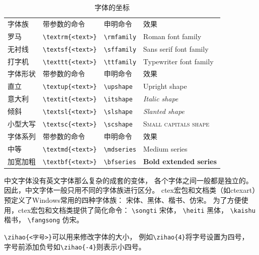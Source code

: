 \documentclass[UTF8]{ctexart}
\numberwithin{equation}{section}			%
\begin{document}
    \begin{table}[hbp]
        \centering
        \caption{字体的坐标}
        \label{tab:fontcoord}
        \begin{tabular}{llll}
            \toprule
            字体族 & 带参数的命令 & 申明命令 & 效果 \\
            罗马 & \verb|\textrm{<text>}| & \verb|\rmfamily|
                & \rmfamily Roman font family \\
            无衬线 & \verb|\textsf{<text>}| & \verb|\sffamily|
                & \sffamily Sans serif font family \\
            打字机 & \verb|\texttt{<text>}| & \verb|\ttfamily|
                & \ttfamily Typewriter font family \\
            \midrule
            字体形状 & 带参数的命令 & 申明命令 & 效果 \\
            直立 & \verb|\textup{<text>}| & \verb|\upshape|
                & \upshape Upright shape \\
            意大利 & \verb|\textit{<text>}| & \verb|\itshape|
                & \itshape Italic shape \\
            倾斜& \verb|\textsl{<text>}| & \verb|\slshape|
                & \slshape Slanted shape \\
            小型大写 & \verb|\textsc{<text>}| & \verb|\scshape|
                & \scshape Small capitals shape \\
            \midrule
            字体系列 & 带参数的命令 & 申明命令 & 效果 \\
            中等 & \verb|\textmd{<text>}| & \verb|\mdseries|
                & \mdseries Medium series \\
            加宽加粗 & \verb|\textbf{<text>}| & \verb|\bfseries|
                & \bfseries Bold extended series \\
            \bottomrule
        \end{tabular}
    \end{table}

    中文字体没有英文字体那么复杂的成套的变体，
    各个字体之间一般都是独立的。
    因此，中文字体一般只用不同的字体族进行区分。
    ctex宏包和文档类（如ctexart）预定义了Windows常用的四种字体族：
    宋体、黑体、楷书、仿宋。
    为了方便使用，ctex宏包和文档类提供了简化命令：
    \verb|\songti| {\songti 宋体}，
    \verb|\heiti| {\heiti 黑体}，
    \verb|\kaishu| {\kaishu 楷书}，
    \verb|\fangsong| {\fangsong 仿宋}。
    
    \verb|\zihao{<字号>}|可以用来修改字体的大小，
    例如\verb|\zihao{4}|将字号设置为四号，
    字号前添加负号如\verb|\zihao{-4}|则表示小四号。
    
\end{document}
